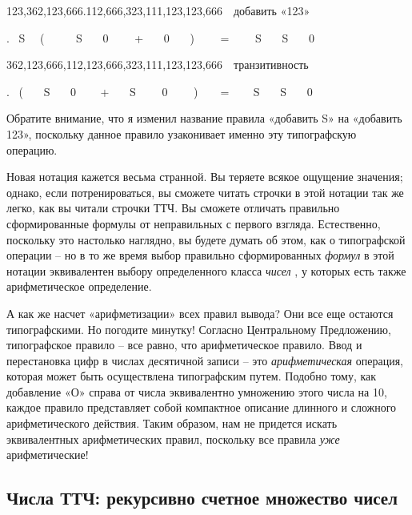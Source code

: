 \documentclass[../main.tex]{subfiles}
\begin{document}
123,362,123,666.112,666,323,111,123,123,666~~добавить «123»

. ~S~~ (~~~~~ S~~~ 0~~~~ +~~ ~0~~~ )~~~~ =~~~~ S~~~ S~~~ 0

362,123,666,112,123,666,323,111,123,123,666~~транзитивность

.~ (~~~ S~~~ 0 ~~~ +~~~ S~~~~ 0~~~~ )~~~~= ~~~ S~~ ~S~~~ 0

Обратите внимание, что я изменил название правила «добавить S» на «добавить 123», поскольку данное правило узаконивает именно эту типографскую операцию.

Новая нотация кажется весьма странной. Вы теряете всякое ощущение значения; однако, если потренироваться, вы сможете читать строчки в этой нотации так же легко, как вы читали строчки ТТЧ. Вы сможете отличать правильно сформированные формулы от неправильных с первого взгляда. Естественно, поскольку это настолько наглядно, вы будете думать об этом, как о типографской операции \--- но в то же время выбор правильно сформированных \emph{формул} в этой нотации эквивалентен выбору определенного класса \emph{чисел} , у которых есть также арифметическое определение.

А как же насчет «арифметизации» всех правил вывода? Они все еще остаются типографскими. Но погодите минутку! Согласно Центральному Предложению, типографское правило \--- все равно, что арифметическое правило. Ввод и перестановка цифр в числах десятичной записи \--- это \emph{арифметическая} операция, которая может быть осуществлена типографским путем. Подобно тому, как добавление «О» справа от числа эквивалентно умножению этого числа на 10, каждое правило представляет собой компактное описание длинного и сложного арифметического действия. Таким образом, нам не придется искать эквивалентных арифметических правил, поскольку все правила \emph{уже} арифметические!


\subsection{Числа ТТЧ: рекурсивно счетное множество чисел}
\end{document}
